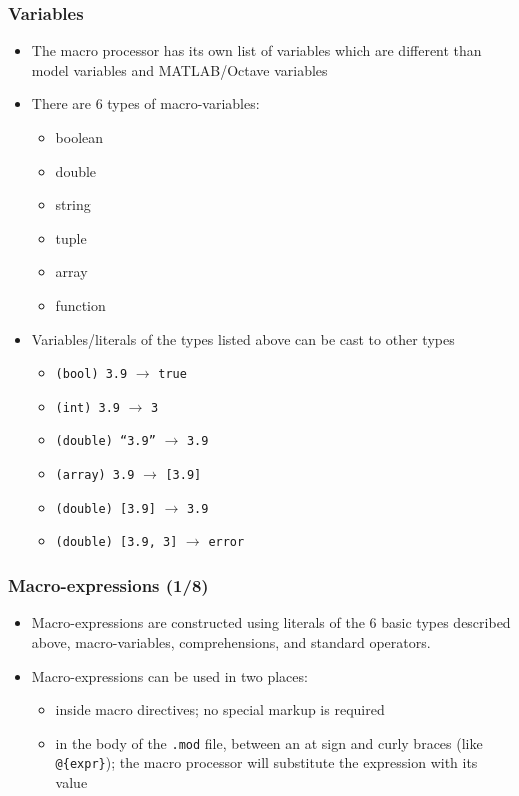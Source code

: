 \documentclass{beamer}
\begin{document}
\begin{frame}
\frametitle{Variables}
\begin{itemize}
\item The macro processor has its own list of variables which are different than model variables and MATLAB/Octave variables
\item There are 6 types of macro-variables:
  \begin{itemize}
  \item boolean
  \item double
  \item string
  \item tuple
  \item array
  \item function
  \end{itemize}
\item Variables/literals of the types listed above can be cast to other types
  \begin{itemize}
  \item \texttt{(bool) 3.9} $\rightarrow$ \texttt{true}
  \item \texttt{(int) 3.9} $\rightarrow$ \texttt{3}
  \item \texttt{(double) ``3.9''} $\rightarrow$ \texttt{3.9}
  \item \texttt{(array) 3.9} $\rightarrow$ \texttt{[3.9]}
  \item \texttt{(double) [3.9]} $\rightarrow$ \texttt{3.9}
  \item \texttt{(double) [3.9, 3]} $\rightarrow$ \texttt{error}
  \end{itemize}
\end{itemize}
\end{frame}

\begin{frame}[fragile=singleslide]
  \frametitle{Macro-expressions (1/8)}
  \begin{itemize}
    \item Macro-expressions are constructed using literals of the 6 basic types
      described above, macro-variables, comprehensions, and standard operators.
    \item Macro-expressions can be used in two places:
      \begin{itemize}
      \item inside macro directives; no special markup is required
      \item in the body of the \texttt{.mod} file, between an at sign and curly braces (like \verb+@{expr}+); the macro processor will substitute the expression with its value
      \end{itemize}
  \end{itemize}
\end{frame}
\end{document}
